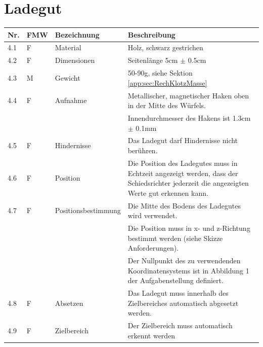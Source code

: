 \documentclass[a4paper]{report}
\begin{document}
\section{Ladegut}
\label{app:sec:AnfLadegut}
\begin{tabular}{|p{}|p{}|p{}|p{}|}
	\hline
	\textbf{Nr.} & \textbf{FMW\footnotemark} & \textbf{Bezeichnung} & \textbf{Beschreibung} \\
	\hline
	4.1 & F & Material & Holz, schwarz gestrichen \\
	\hline
	4.2 & F &  Dimensionen & Seitenlänge 5cm $\pm$ 0.5cm \\
	\hline
	4.3 & M & Gewicht & 50-90g, siehe Sektion \ref{app:sec:RechKlotzMasse} \\ %
	\hline
	4.4 & F & Aufnahme & Metallischer, magnetischer Haken oben in der Mitte des Würfels.\\
	& & & Innendurchmesser des Hakens ist 1.3cm $\pm$ 0.1mm\\
	\hline
	4.5 & F & Hindernisse & Das Ladegut darf Hindernisse nicht berühren. \\
	\hline
	4.6 & F & Position & Die Position des Ladegutes muss in Echtzeit angezeigt werden, dass der Schiedsrichter jederzeit die angezeigten Werte gut erkennen kann.\\
	\hline
	4.7 & F & Positionsbestimmung & Die Mitte des Bodens des Ladegutes wird verwendet.\\
	& & & Die Position muss in x- und z-Richtung bestimmt werden (siehe Skizze Anforderungen).\\
	& & & Der Nullpunkt des zu verwendenden Koordinatensystems ist in Abbildung 1 der Aufgabenstellung definiert. \\
	\hline
	4.8 & F & Absetzen & Das Ladegut muss innerhalb des Zielbereiches automatisch abgesetzt werden. \\
	\hline
	4.9 & F & Zielbereich & Der Zielbereich muss automatisch erkennt werden\\
	\hline
\end{tabular}
\end{document}

